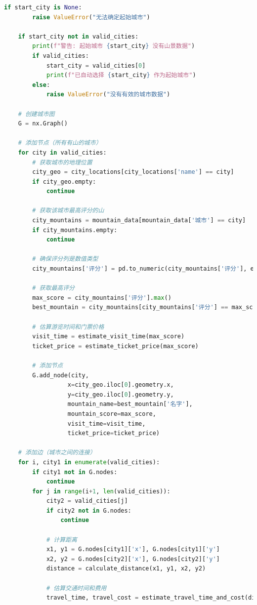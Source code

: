 \documentclass[withoutpreface,bwprint]{cumcmthesis} %
\begin{document}
\begin{appendices}
\begin{lstlisting}[language=python]
    if start_city is None:
        raise ValueError("无法确定起始城市")
    
    if start_city not in valid_cities:
        print(f"警告: 起始城市 {start_city} 没有山景数据")
        if valid_cities:
            start_city = valid_cities[0]
            print(f"已自动选择 {start_city} 作为起始城市")
        else:
            raise ValueError("没有有效的城市数据")
    
    # 创建城市图
    G = nx.Graph()
    
    # 添加节点（所有有山的城市）
    for city in valid_cities:
        # 获取城市的地理位置
        city_geo = city_locations[city_locations['name'] == city]
        if city_geo.empty:
            continue
        
        # 获取该城市最高评分的山
        city_mountains = mountain_data[mountain_data['城市'] == city]
        if city_mountains.empty:
            continue
        
        # 确保评分列是数值类型
        city_mountains['评分'] = pd.to_numeric(city_mountains['评分'], errors='coerce')
        
        # 获取最高评分
        max_score = city_mountains['评分'].max()
        best_mountain = city_mountains[city_mountains['评分'] == max_score].iloc[0]
        
        # 估算游览时间和门票价格
        visit_time = estimate_visit_time(max_score)
        ticket_price = estimate_ticket_price(max_score)
        
        # 添加节点
        G.add_node(city, 
                  x=city_geo.iloc[0].geometry.x, 
                  y=city_geo.iloc[0].geometry.y,
                  mountain_name=best_mountain['名字'],
                  mountain_score=max_score,
                  visit_time=visit_time,
                  ticket_price=ticket_price)
    
    # 添加边（城市之间的连接）
    for i, city1 in enumerate(valid_cities):
        if city1 not in G.nodes:
            continue
        for j in range(i+1, len(valid_cities)):
            city2 = valid_cities[j]
            if city2 not in G.nodes:
                continue
            
            # 计算距离
            x1, y1 = G.nodes[city1]['x'], G.nodes[city1]['y']
            x2, y2 = G.nodes[city2]['x'], G.nodes[city2]['y']
            distance = calculate_distance(x1, y1, x2, y2)
            
            # 估算交通时间和费用
            travel_time, travel_cost = estimate_travel_time_and_cost(distance)
            

\end{lstlisting}
\end{appendices}
\end{document}
